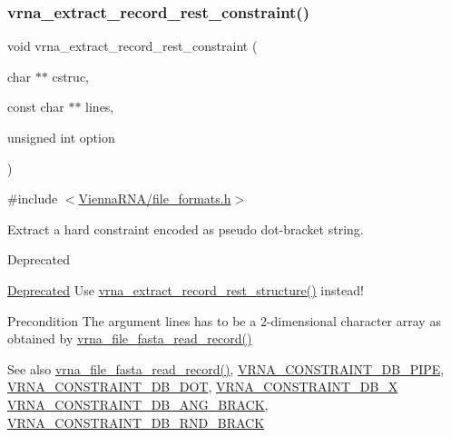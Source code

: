 \subsubsection{\texorpdfstring{vrna\+\_\+extract\+\_\+record\+\_\+rest\+\_\+constraint()}{vrna\_extract\_record\_rest\_constraint()}}
{\footnotesize\ttfamily void vrna\+\_\+extract\+\_\+record\+\_\+rest\+\_\+constraint (\begin{DoxyParamCaption}\item[{char $\ast$$\ast$}]{cstruc,  }\item[{const char $\ast$$\ast$}]{lines,  }\item[{unsigned int}]{option }\end{DoxyParamCaption})}



{\ttfamily \#include $<$\hyperlink{file__formats_8h}{Vienna\+R\+N\+A/file\+\_\+formats.\+h}$>$}



Extract a hard constraint encoded as pseudo dot-\/bracket string. 

\begin{DoxyRefDesc}{Deprecated}
\item[\hyperlink{deprecated__deprecated000064}{Deprecated}]Use \hyperlink{group__file__utils_gad37cbb63a05eed63ba25c91628409be0}{vrna\+\_\+extract\+\_\+record\+\_\+rest\+\_\+structure()} instead! \end{DoxyRefDesc}
\begin{DoxyPrecond}{Precondition}
The argument \textquotesingle{}lines\textquotesingle{} has to be a 2-\/dimensional character array as obtained by \hyperlink{group__file__utils_ga8cfb7e271efc9e1f34640acb85475639}{vrna\+\_\+file\+\_\+fasta\+\_\+read\+\_\+record()} 
\end{DoxyPrecond}
\begin{DoxySeeAlso}{See also}
\hyperlink{group__file__utils_ga8cfb7e271efc9e1f34640acb85475639}{vrna\+\_\+file\+\_\+fasta\+\_\+read\+\_\+record()}, \hyperlink{group__hard__constraints_ga13053547a2de5532b64b64d35e097ae1}{V\+R\+N\+A\+\_\+\+C\+O\+N\+S\+T\+R\+A\+I\+N\+T\+\_\+\+D\+B\+\_\+\+P\+I\+PE}, \hyperlink{group__hard__constraints_ga369bea82eae75fbe626f409fa425747e}{V\+R\+N\+A\+\_\+\+C\+O\+N\+S\+T\+R\+A\+I\+N\+T\+\_\+\+D\+B\+\_\+\+D\+OT}, \hyperlink{group__hard__constraints_ga7283bbe0f8954f7b030ecc3f2d1932b2}{V\+R\+N\+A\+\_\+\+C\+O\+N\+S\+T\+R\+A\+I\+N\+T\+\_\+\+D\+B\+\_\+X} \hyperlink{constraints__hard_8h_ad54c1315a47d55653dcaa5de6e544b77}{V\+R\+N\+A\+\_\+\+C\+O\+N\+S\+T\+R\+A\+I\+N\+T\+\_\+\+D\+B\+\_\+\+A\+N\+G\+\_\+\+B\+R\+A\+CK}, \hyperlink{group__hard__constraints_gac17b034852c914bc5879954c65d7e74b}{V\+R\+N\+A\+\_\+\+C\+O\+N\+S\+T\+R\+A\+I\+N\+T\+\_\+\+D\+B\+\_\+\+R\+N\+D\+\_\+\+B\+R\+A\+CK}
\end{DoxySeeAlso}

